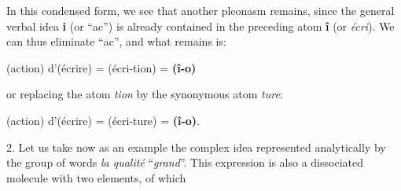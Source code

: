 \begin{sloppypar}
{   \noindent
   {\small
   }

   In this condensed form, we see that another pleonasm remains, since
   the general verbal idea \textbf{i} (or ``ac'') is already contained
   in the preceding atom \textbf{î} (or \emph{écri}).  We can thus
   eliminate ``ac'', and what remains is:

 \begin{center}
   (action) d’(écrire) = (écri-tion) = \textbf{(î-o)}
 \end{center}

  \noindent
  or replacing the atom \emph{tion} by the synonymous atom \emph{ture}:

  \begin{center}
    (action) d’(écrire) = (écri-ture) = \textbf{(î-o)}.
  \end{center}

  2. Let us take now as an example the complex idea represented
  analytically by the group of words \emph{la qualité}
    ``\emph{grand}''. This expression is also a dissociated molecule with
  two elements, of which

}

\end{sloppypar}

